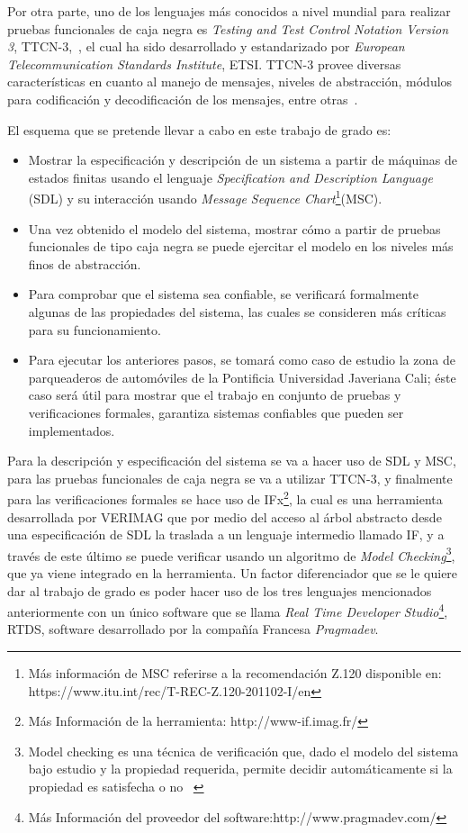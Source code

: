 Por otra parte, uno de los lenguajes m\'as conocidos a nivel mundial para 
realizar pruebas funcionales de caja negra es \textit{Testing and Test Control 
Notation Version 3}, TTCN-3,~\cite{Willcock2011,  ETSI}, el cual ha 
sido desarrollado y estandarizado por \textit{European Telecommunication 
Standards Institute}, ETSI. TTCN-3 provee diversas caracter\'isticas en cuanto 
al manejo de mensajes, niveles de abstracci\'on, m\'odulos para codificaci\'on 
y decodificaci\'on de los mensajes, entre otras~\cite{Willcock2011,ETSI}.

El esquema que se pretende llevar a cabo en este trabajo de grado es: 

\begin{itemize}
\item Mostrar la especificaci\'on y descripci\'on de un sistema a partir de 
m\'aquinas de estados finitas usando el lenguaje \textit{Specification and 
Description Language} (SDL) y su interacci\'on usando \textit{Message Sequence 
Chart}\footnote{M\'as informaci\'on de MSC referirse a la recomendaci\'on Z.120 
disponible en:  https://www.itu.int/rec/T-REC-Z.120-201102-I/en}(MSC).
\item Una vez obtenido el modelo del sistema, mostrar c\'omo a partir de 
pruebas funcionales de tipo caja negra se puede ejercitar el modelo en los 
niveles m\'as finos  de abstracci\'on. 
\item Para comprobar que el sistema sea confiable, se verificar\'a formalmente 
algunas de las propiedades del sistema, las cuales se consideren m\'as 
cr\'iticas para su funcionamiento.
\item Para ejecutar los anteriores pasos, se tomar\'a como caso de estudio la 
zona de parqueaderos de autom\'oviles de la Pontificia Universidad Javeriana 
Cali; \'este caso ser\'a \'util para mostrar que el trabajo en conjunto de 
pruebas y verificaciones formales,  garantiza  sistemas confiables que pueden 
ser implementados.

\end{itemize}

Para la descripci\'on y especificaci\'on del sistema se va a hacer uso de SDL y 
MSC, para las pruebas funcionales de caja negra se va a utilizar TTCN-3, y 
finalmente para las verificaciones formales se hace uso de IFx\footnote{M\'as 
Informaci\'on de la herramienta: http://www-if.imag.fr/}, la cual es una 
herramienta desarrollada por VERIMAG que por medio del acceso al \'arbol 
abstracto desde una especificaci\'on de SDL la traslada a un lenguaje intermedio 
llamado IF,  y a trav\'es de este \'ultimo se puede verificar usando un 
algoritmo de \textit{Model Checking}\footnote{Model checking es una t\'ecnica 
de verificaci\'on que, dado el modelo del sistema bajo estudio y la propiedad 
requerida, permite decidir autom\'aticamente si la propiedad es satisfecha o no 
~\cite{Clarke1996,Hames2009}}, que ya viene 
integrado en la herramienta. Un factor diferenciador que se le quiere dar al 
trabajo de grado es poder hacer uso de los tres lenguajes mencionados 
anteriormente con un \'unico software que se llama \textit{Real Time Developer 
Studio}\footnote{M\'as Informaci\'on del proveedor del 
software:http://www.pragmadev.com/}, RTDS, software desarrollado por la 
compa\~n\'ia Francesa \textit{Pragmadev}.

